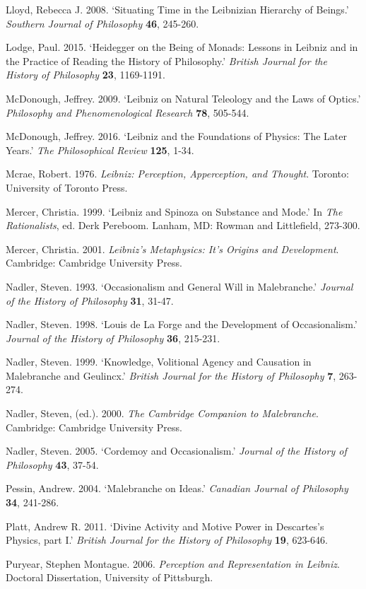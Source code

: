 \documentclass{article}
\begin{document}
Lloyd, Rebecca J. 2008. `Situating Time in the Leibnizian Hierarchy of
Beings.' \emph{Southern Journal of Philosophy} \textbf{46}, 245-260.

Lodge, Paul. 2015. `Heidegger on the Being of Monads: Lessons in Leibniz
and in the Practice of Reading the History of Philosophy.' \emph{British
Journal for the History of Philosophy} \textbf{23}, 1169-1191.

McDonough, Jeffrey. 2009. `Leibniz on Natural Teleology and the Laws of
Optics.' \emph{Philosophy and Phenomenological Research} \textbf{78},
505-544.

McDonough, Jeffrey. 2016. `Leibniz and the Foundations of Physics: The
Later Years.' \emph{The Philosophical Review} \textbf{125}, 1-34.

Mcrae, Robert. 1976. \emph{Leibniz: Perception, Apperception, and
Thought}. Toronto: University of Toronto Press.

Mercer, Christia. 1999. `Leibniz and Spinoza on Substance and Mode.' In
\emph{The Rationalists}, ed. Derk Pereboom. Lanham, MD: Rowman and
Littlefield, 273-300.

Mercer, Christia. 2001. \emph{Leibniz's Metaphysics: It's Origins and
Development}. Cambridge: Cambridge University Press.

Nadler, Steven. 1993. `Occasionalism and General Will in Malebranche.'
\emph{Journal of the History of Philosophy} \textbf{31}, 31-47.

Nadler, Steven. 1998. `Louis de La Forge and the Development of
Occasionalism.' \emph{Journal of the History of Philosophy} \textbf{36},
215-231.

Nadler, Steven. 1999. `Knowledge, Volitional Agency and Causation in
Malebranche and Geulincx.' \emph{British Journal for the History of
Philosophy} \textbf{7}, 263-274.

Nadler, Steven, (ed.). 2000. \emph{The Cambridge Companion to
Malebranche}. Cambridge: Cambridge University Press.

Nadler, Steven. 2005. `Cordemoy and Occasionalism.' \emph{Journal of the
History of Philosophy} \textbf{43}, 37-54.

Pessin, Andrew. 2004. `Malebranche on Ideas.' \emph{Canadian Journal of
Philosophy} \textbf{34}, 241-286.

Platt, Andrew R. 2011. `Divine Activity and Motive Power in Descartes's
Physics, part I.' \emph{British Journal for the History of Philosophy}
\textbf{19}, 623-646.

Puryear, Stephen Montague. 2006. \emph{Perception and Representation in
Leibniz}. Doctoral Dissertation, University of Pittsburgh.
\end{document}
